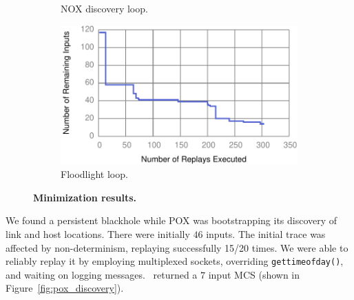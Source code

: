 \begin{figure}[!htb]
\begin{subfigure}{0.33\textwidth}
    \caption[]{\label{fig:nox_discovery} NOX discovery loop. }
\end{subfigure}\hfill
\begin{subfigure}{0.33\textwidth}
    \includegraphics[width=\textwidth]{../graphs/runtime/floodlight_loop.pdf}
    \caption[]{\label{fig:fl_loop} Floodlight loop. }
\end{subfigure}
\caption{\textbf{Minimization results.}}
\end{figure}

 We found a persistent
blackhole while POX was bootstrapping its discovery of link and host locations.
There were initially $46$ inputs. The initial trace was affected by
non-determinism, replaying successfully 15/20 times.
We were able to reliably replay it by employing multiplexed sockets, overriding {\tt gettimeofday()},
and waiting on logging messages. \projectname~returned a $7$ input MCS
(shown in Figure~\ref{fig:pox_discovery}).


